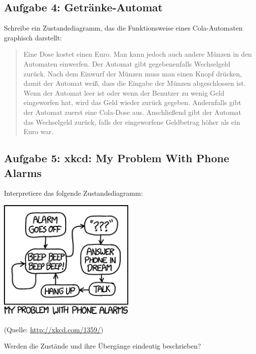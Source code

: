 \subsection{Aufgabe 4: Getränke-Automat}

Schreibe ein Zustandsdiagramm, das die Funktionsweise eines Cola-Automaten
graphisch darstellt:

\begin{quotation}
Eine Dose kostet einen Euro. Man kann jedoch auch andere Münzen in den Automaten
einwerfen. Der Automat gibt gegebenenfalls Wechselgeld zurück. Nach dem Einwurf der
Münzen muss man einen Knopf drücken, damit der Automat weiß, dass die Eingabe der
Münzen abgeschlossen ist. Wenn der Automat leer ist oder wenn der Benutzer zu wenig
Geld eingeworfen hat, wird das Geld wieder zurück gegeben. Andernfalls gibt der
Automat zuerst eine Cola-Dose aus. Anschließend gibt der Automat das Wechselgeld
zurück, falls der eingeworfene Geldbetrag höher als ein Euro war.
\end{quotation}


\subsection{Aufgabe 5: xkcd: My Problem With Phone Alarms}

Interpretiere das folgende \glqq Zustandsdiagramm\grqq :

\begin{center}
\includegraphics[width=0.5\textwidth]{./inf/SEKII/11_UML_Zustandsdiagramme/phone_alarm.png}
\end{center}

(Quelle: \url{http://xkcd.com/1359/})

Werden die Zustände und ihre Übergänge eindeutig beschrieben?